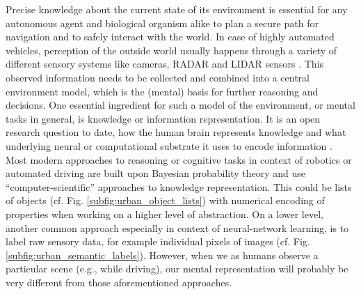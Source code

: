 Precise knowledge about the current state of its environment is essential for any autonomous agent and biological organism alike to plan a secure path for navigation and to safely interact with the world.
In case of highly automated vehicles, perception of the outside world usually happens through a variety of different sensory systems like cameras, \acs{RADAR} and \acs{LIDAR} sensors \parencite{Aeberhard2015}.
This observed information needs to be collected and combined into a central environment model, which is the (mental) basis for further reasoning and decisions.
One essential ingredient for such a model of the environment, or mental tasks in general, is knowledge or information representation.
It is an open research question to date, how the human brain represents knowledge and what underlying neural or computational substrate it uses to encode information \parencite{Wang2003, Samsonovich2012, Handjaras2016}.
Most modern approaches to reasoning or cognitive tasks in context of robotics or automated driving are built upon Bayesian probability theory and use \enquote{computer-scientific} approaches to knowledge representation.
This could be lists of objects (cf. Fig. \ref{subfig:urban_object_lists}) with numerical encoding of properties when working on a higher level of abstraction.
On a lower level, another common approach especially in context of neural-network learning, is to label raw sensory data, for example individual pixels of images (cf. Fig. \ref{subfig:urban_semantic_labels}).
However, when we as humans observe a particular scene (e.g., while driving), our mental representation will probably be very different from those aforementioned approaches.
